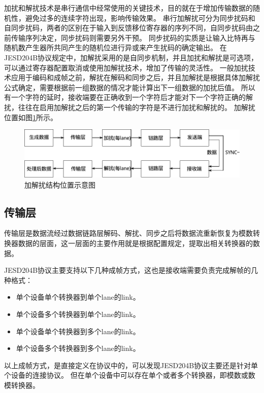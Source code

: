 \documentclass[UTF8]{ctexart}
\begin{document}
加扰和解扰技术是串行通信中经常使用的关键技术，目的就在于增加传输数据的随机性，避免过多的连续字符出现，影响传输效果。
串行加解扰可分为同步扰码和自同步扰码，两者的区别在于输入到反馈移位寄存器的序列不同，自同步扰码由之前传输序列决定，同步扰码则需要另外干预。
同步扰码的实质是让输入比特再与随机数产生器所共同产生的随机位进行异或来产生扰码的确定输出。
在JESD204B协议规定中，加解扰采用的是自同步机制，并且加扰和解扰是可选项，可以通过寄存器配置取消或使用加解扰技术，增加了传输的灵活性。
一般加扰技术应用于编码和成帧之前，解扰在解码和同步之后，并且加解扰是根据具体加解扰公式确定，需要根据前一组数据的情况才能计算出下一组数据的加扰后值。
所以有一个字符的延时，接收端要在正确收到一个字符后才能对下一个字符正确的解扰，往往在启用加解扰之后的第一个传输的字符是不进行加扰和解扰的。
加解扰位置如图\ref{fig:functional_location_of_scrambler_and_descrambler}所示。

\begin{figure}[H]
\centering
\includegraphics[width=15cm]{./img/functional_location_of_scrambler_and_descrambler.pdf}
\caption{加解扰结构位置示意图}
\label{fig:functional_location_of_scrambler_and_descrambler}
\end{figure}

\subsection{传输层}

传输层是数据流经过数据链路层解码、解扰、同步之后将数据流重新恢复为模数转换器数据的层面，这一层面的主要作用就是根据配置规定，提取出相关转换器的数据。

JESD204B协议主要支持以下几种成帧方式，这也是接收端需要负责完成解帧的几种格式：

\begin{itemize}
\item 单个设备单个转换器到单个lane的link。
\item 单个设备多个转换器到单个lane的link。
\item 单个设备单个转换器到多个lane的link。
\item 单个设备多个转换器到多个lane的link。
\end{itemize}

以上成帧方式，是直接定义在协议中的，可以发现JESD204B协议主要还是针对单个设备的连接协议。
但在单个设备中可以存在单个或者多个转换器，即模数或数模转换器。
\end{document}
